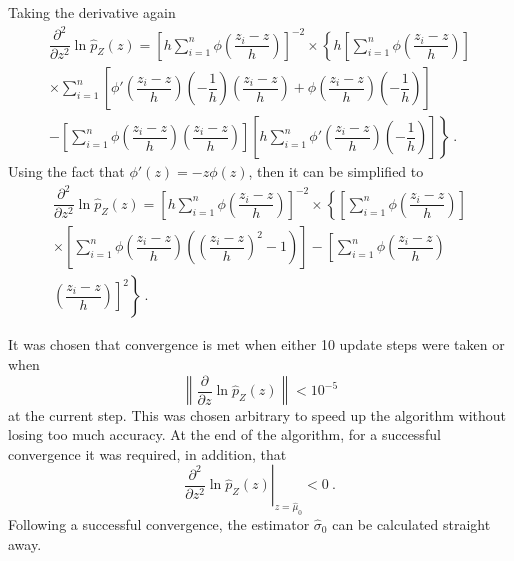 Taking the derivative again
\begin{multline}
	\dfrac{
		\partial^2
	}
	{
		\partial z^2
	}
	\ln\widehat{p}_Z(z)
	=
	\left[
		h\sum_{i=1}^n
		\phi\left(
			\dfrac{
				z_i-z
			}
			{
				h
			}
		\right)
	\right]^{-2}
	\times
	\left\{
		h\left[
			\sum_{i=1}^n
			\phi\left(
				\dfrac{
					z_i-z
				}
				{
					h
				}
			\right)
		\right]
	\right.
	\\
	\left.
		\times
		\sum_{i=1}^n\left[
			\phi'\left(
				\dfrac{
					z_i-z
				}
				{
					h
				}
			\right)
			\left(
				-\dfrac{
					1
				}
				{
					h
				}
			\right)
			\left(
				\dfrac{
					z_i-z
				}
				{
					h
				}
			\right)
			+\phi\left(
				\dfrac{
					z_i-z
				}
				{
					h
				}
			\right)
			\left(
				-\dfrac{
					1
				}
				{
					h
				}
			\right)
		\right]
	\right.
	\\
	\left.
		-
		\left[
			\sum_{i=1}^n
			\phi\left(
				\dfrac{
					z_i-z
				}
				{
					h
				}
			\right)
			\left(
				\dfrac{
					z_i-z
				}
				{
					h
				}
			\right)
		\right]
		\left[
			h\sum_{i=1}^n
			\phi'\left(
				\dfrac{
					z_i-z
				}
				{
					h
				}
			\right)
			\left(
				-\dfrac{
					1
				}
				{
					h
				}
			\right)
		\right]
	\right\}
	\ .
\end{multline}
Using the fact that $\phi'(z)=-z\phi(z)$, then it can be simplified to
\begin{multline}
	\dfrac{
		\partial^2
	}
	{
		\partial z^2
	}
	\ln\widehat{p}_Z(z)
	=
	\left[
		h\sum_{i=1}^n
		\phi\left(
			\dfrac{
				z_i-z
			}
			{
				h
			}
		\right)
	\right]^{-2}
	\times
	\left\{
		\left[
			\sum_{i=1}^n
			\phi\left(
				\dfrac{
					z_i-z
				}
				{
					h
				}
			\right)
		\right]
	\right.
	\\
	\left.
		\times
		\left[
			\sum_{i=1}^n
			\phi\left(
				\dfrac{
					z_i-z
				}
				{
					h
				}
			\right)
			\left(
				\left(
					\dfrac{
						z_i-z
					}
					{
						h
					}
				\right)^2
				-1
			\right)
		\right]
		-
		\left[
			\sum_{i=1}^n
			\phi\left(
				\dfrac{
					z_i-z
				}
				{
					h
				}
			\right)
		\right.
	\right.
	\\
	\left.
		\left.
			\left(
				\dfrac{
					z_i-z
				}
				{
					h
				}
			\right)
		\right]^2
	\right\}
	\ .
\end{multline}

It was chosen that convergence is met when either 10 update steps were taken or when
\begin{equation}
	\left\|
		\dfrac{
			\partial
		}
		{
			\partial z
		}
	\ln\widehat{p}_Z(z)
	\right\|
	<10^{-5}
\end{equation}
at the current step. This was chosen arbitrary to speed up the algorithm without losing too much accuracy. At the end of the algorithm, for a successful convergence it was required, in addition, that
\begin{equation}
	\left.
		\dfrac{
			\partial^2
		}
		{
			\partial z^2
		}
		\ln\widehat{p}_Z(z)
	\right|_{z=\widehat{\mu}_0}
	< 0 \ .
\end{equation}
Following a successful convergence, the estimator $\widehat{\sigma}_0$ can be calculated straight away.

